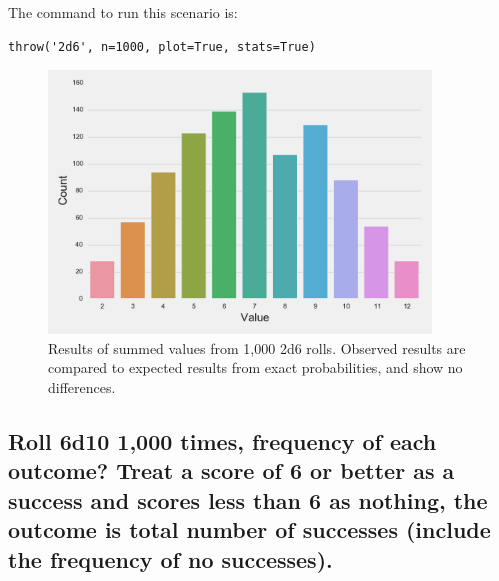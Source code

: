 \documentclass{article}
\begin{document}
The command to run this scenario is:

\begin{lstlisting}
throw('2d6', n=1000, plot=True, stats=True)
\end{lstlisting}

\begin{figure}[H]
\begin{floatrow}
\includegraphics[width=4in]{2d6.pdf}
\end{floatrow}
\caption{Results of summed values from 1,000 2d6 rolls. Observed results are compared to expected results from exact probabilities, and show no differences.}
\end{figure}

\subsection{Roll 6d10 1,000 times, frequency of each outcome? Treat a score of 6 or better as a success and scores less than 6 as nothing, the outcome is total number of successes (include the frequency of no successes).}
\end{document}
